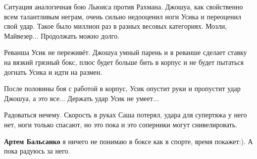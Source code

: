 \begin{itemize}
\begin{itemize}
\end{itemize} %


Ситуация аналогичная бою Льюиса против Рахмана. Джошуа, как свойственно всем
талантливым неграм, очень сильно недооценил ноги Усика и переоценил свой удар.
Такое было миллион раз в разных весовых категориях. Мозли, Майвезер...
Продолжать можно долго.

Реванша Усик не переживёт. Джошуа умный парень и в реванше сделает ставку на
вязкий грязный бокс, плюс будет больше бить в корпус и не будет пытаться
догнать Усика и идти на размен.

После половины боя с работой в корпус, Усик опустит руки и пропустит удар
Джошуа, а это все... Держать удар Усик не умеет...

Радоваться нечему. Скорость в руках Саша потерял, удара для супертяжа у него
нет, ноги только спасают, но это пока и это соперники могут снивелировать.

\begin{itemize} %
\textbf{Артем Бальсанко} я ничего не понимаю в боксе как в спорте, время покажет:). А пока радуюсь за него.
\end{itemize} %

\end{itemize} %
